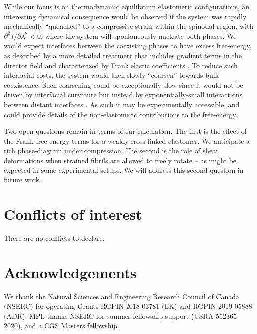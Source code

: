 \documentclass[twoside,twocolumn,9pt]{article}
\renewcommand{\refname}{Notes and references}
\begin{document}
While our focus is on thermodynamic equilibrium elastomeric configurations, an interesting dynamical consequence would be observed if the system was rapidly mechanically ``quenched'' to a compressive strain within the spinodal region, with $\partial^2 f/\partial \lambda^2<0$, where the system will spontaneously nucleate both phases. We would expect interfaces between the coexisting phases to have excess free-energy, as described by a more detailed treatment that includes gradient terms in the director field and characterized by Frank elastic coefficients \cite{Leighton:2021a}.  To reduce such interfacial costs, the system would then slowly ``coarsen'' towards bulk coexistence. Such coarsening could be exceptionally slow since it would not be driven by interfacial curvature \cite{Bray:2002} but instead by exponentially-small interactions between distant interfaces \cite{Rutenberg:1994}. As such it may be experimentally accessible, and could provide details of the non-elastomeric contributions to the free-energy.

Two open questions remain in terms of our calculation. The first is the effect of the Frank free-energy terms for a weakly cross-linked elastomer. We anticipate a rich phase-diagram under compression. The second is the role of shear deformations when strained fibrils are allowed to freely rotate – as might be expected in some experimental setups. We will address this second question in future work \cite{Leighton:2021b}.

\section*{Conflicts of interest}
There are no conflicts to declare.
\section*{Acknowledgements}
We thank the Natural Sciences and Engineering Research Council of Canada (NSERC) for operating Grants RGPIN-2018-03781 (LK) and RGPIN-2019-05888 (ADR). MPL thanks NSERC for summer fellowship support (USRA-552365-2020), and a CGS Masters fellowship.
\balance

 
\end{document}
